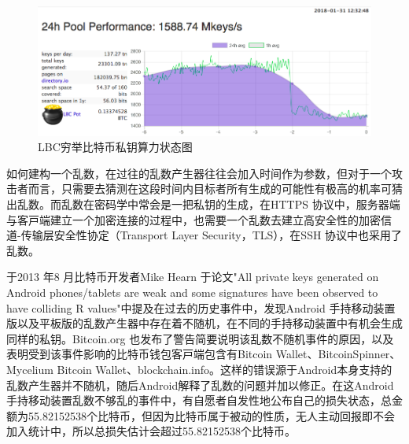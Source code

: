 				\begin{figure}[!htbp]
					\centering
					\includegraphics[width = .9\textwidth]{LBC.png}
					\caption{LBC穷举比特币私钥算力状态图\supercite{TheLargeBitcoinCollider}}\label{LBC}
				\end{figure}

				如何建构一个乱数，在过往的乱数产生器往往会加入时间作为参数，但对于一个攻击者而言，只需要去猜测在这段时间内目标者所有生成的可能性有极高的机率可猜出乱数。而乱数在密码学中常会是一把私钥的生成，在HTTPS 协议中，服务器端与客⼾端建⽴⼀个加密连接的过程中，也需要⼀个乱数去建⽴⾼安全性的加密信道-传输层安全性协定（Transport Layer Security，TLS）\supercite{dierks2008transport}，在SSH 协议\supercite{ThesecureshellSSHprotocolarchitecture}中也采用了乱数。
		
				于2013 年8 ⽉⽐特币开发者Mike Hearn 于论文"All private keys generated on Android phones/tablets are weak and some signatures have been observed to have colliding R values"\supercite{SomeSecureRandomThoughts}中提及在过去的历史事件中，发现Android 手持移动装置版以及平板版的乱数产生器中存在着不随机，在不同的手持移动装置中有机会生成同样的私钥。Bitcoin.org 也发布了警告\supercite{AndroidSecurityVulnerability}简要说明该乱数不随机事件的原因，以及表明受到该事件影响的⽐特币钱包客⼾端包含有Bitcoin Wallet、BitcoinSpinner、Mycelium Bitcoin Wallet、blockchain.info。这样的错误源于Android本身支持的乱数产生器并不随机，随后Android解释了乱数的问题并加以修正。在这Android手持移动装置乱数不够乱的事件中，有自愿者自发性地公布自己的损失状态，总金额为55.82152538个比特币\supercite{Badsignaturesleading}，但因为比特币属于被动的性质，无人主动回报即不会加入统计中，所以总损失估计会超过55.82152538个比特币。


